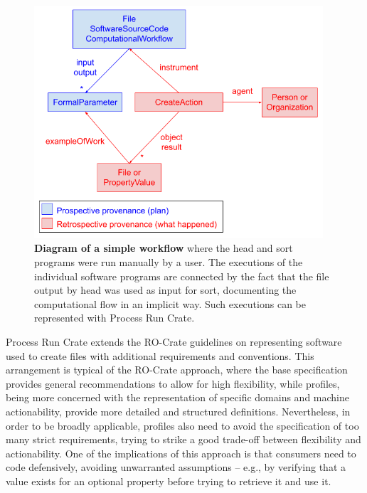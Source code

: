 \documentclass[10pt,letterpaper]{article}
\begin{document}
\begin{figure}[!h]
\includegraphics[width=29em]{image2.png}
\caption{{\bf Diagram of a simple workflow} where the head and sort programs were run manually by a user.
The executions of the individual software programs are connected by the fact that the file output by head was used as input for sort, documenting the computational flow in an implicit way.
Such executions can be represented with Process Run Crate.}
\label{fig:head_sort}
\end{figure}


Process Run Crate extends the RO-Crate guidelines on representing software used to create files with additional requirements and conventions.
This arrangement is typical of the RO-Crate approach, where the base specification provides general recommendations to allow for high flexibility, while profiles, being more concerned with the representation of specific domains and machine actionability, provide more detailed and structured definitions.
Nevertheless, in order to be broadly applicable, profiles also need to avoid the specification of too many strict requirements, trying to strike a good trade-off between flexibility and actionability.
One of the implications of this approach is that consumers need to code defensively, avoiding unwarranted assumptions – e.g., by verifying that a value exists for an optional property before trying to retrieve it and use it.
\end{document}
